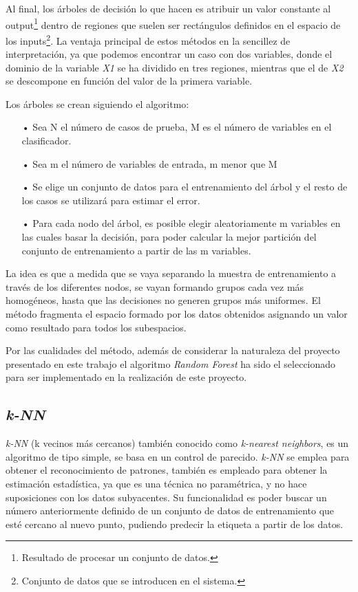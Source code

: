 Al final, los árboles de decisión lo que hacen es atribuir un valor constante al output\footnote{Resultado de procesar un conjunto de datos.} dentro de regiones que suelen ser rectángulos definidos en el espacio de los inputs\footnote{Conjunto de datos que se introducen en el sistema.}. La ventaja principal de estos métodos en la sencillez de interpretación, ya que podemos encontrar un caso con dos variables, donde el dominio de la variable \textit{X1} se ha dividido en tres regiones, mientras que el de \textit{X2} se descompone en función del valor de la primera variable.

Los árboles se crean siguiendo el algoritmo:


\begin{itemize}
\item[•] Sea N el número de casos de prueba, M es el número de variables en el clasificador.
\item[•] Sea m el número de variables de entrada, m menor que M
\item[•] Se elige un conjunto de datos para el entrenamiento del árbol y el resto de los casos se utilizará para estimar el error.
\item[•] Para cada nodo del árbol, es posible elegir aleatoriamente m variables en las cuales basar la decisión, para poder calcular la mejor partición del conjunto de entrenamiento a partir de las m variables.
\end{itemize}

La idea es que a medida que se vaya separando la muestra de entrenamiento a través de los diferentes nodos, se vayan formando grupos cada vez más homogéneos, hasta que las decisiones no generen grupos más uniformes. El método fragmenta el espacio formado por los datos obtenidos asignando un valor como resultado para todos los subespacios.

Por las cualidades del método, además de considerar la naturaleza del proyecto presentado en este trabajo el algoritmo \textit{Random Forest} ha sido el seleccionado para ser implementado en la realización de este proyecto.


\subsection{\textit{k-NN}}

\textit{k-NN} (k vecinos más cercanos) también conocido como \textit{k-nearest neighbors}, es un algoritmo de tipo simple, se basa en un control de parecido. \textit{k-NN} se emplea para obtener el reconocimiento de patrones, también es empleado para obtener la estimación estadística, ya que es una técnica no paramétrica, y no hace suposiciones con los datos subyacentes. Su funcionalidad es poder buscar un número anteriormente definido de un conjunto de datos de entrenamiento que esté cercano al nuevo punto, pudiendo predecir la etiqueta a partir de los datos.

